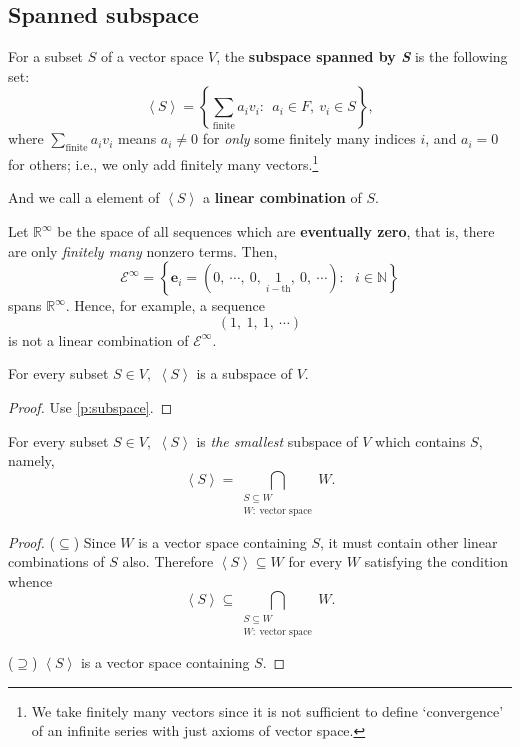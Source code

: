 \subsection{Spanned subspace}

\begin{defn} For a subset $S$ of a vector space $V$, the \textbf{subspace spanned by \textit{S}} is the following set: $$\left< S \right> = \left\{ \sum_{\textrm{finite}} a_i v_i: ~~ a_i\in F,~v_i \in S \right\},$$ where $\sum_{\textrm{finite}} a_i v_i$ means $a_i \ne 0$ for \textit{only} some finitely many indices $i$, and $a_i = 0$ for others; i.e., we only add finitely many vectors.\footnote[2]{We take finitely many vectors since it is not sufficient to define `convergence' of an infinite series with just axioms of vector space.}

And we call a element of $\left< S \right>$ a \textbf{linear combination} of $S$.
\end{defn}

\begin{ex}
Let $\mathbb R^{\infty}$ be the space of all sequences which are \textbf{eventually zero}, that is, there are only \textit{finitely many} nonzero terms. Then,$$ \mathcal E^{\infty} = \left\{\mathbf{e}_i =\left(0,~\cdots,~0,~\underset {i-\textrm{th}} 1,~0,~\cdots\right): ~~~ i\in \mathbb {N} \right\}$$ spans $\mathbb R^\infty.$ Hence, for example, a sequence $$\left(1,~1,~1,~\cdots\right)$$is not a linear combination of $\mathcal E^{\infty}.$
\end{ex}
\begin{prop}
For every subset $S \in V,$ $\left <S\right>$ is a subspace of $V$.
\end{prop}
\begin{proof}
Use \cref{p:subspace}.
\end{proof}

\begin{prop}
For every subset $S \in V,$ $\left <S\right>$ is \textit{the smallest} subspace of $V$ which contains $S$, namely, $$\left<S\right> = \bigcap_{\substack{S \subseteq W \\ W:~\text{vector space}}} W.$$
\end{prop}
\begin{proof}
($\subseteq$) Since $W$ is a vector space containing $S$, it must contain other linear combinations of $S$ also. Therefore $\left< S \right> \subseteq W$ for every $W$ satisfying the condition whence$$\left<S\right> \subseteq \bigcap_{\substack{S \subseteq W \\ W:~\text{vector space}}} W.$$

($\supseteq$) $\left<S\right>$ is a vector space containing $S$.
\end{proof}


